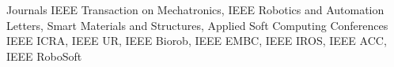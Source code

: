 

\begin{cvskills}
  \cvskill
    {Journals} %
    {IEEE Transaction on Mechatronics, IEEE Robotics and Automation Letters,
    	Smart Materials and Structures,  Applied Soft Computing} %
  \cvskill
    {Conferences} %
    {IEEE ICRA, IEEE UR, IEEE Biorob, IEEE EMBC, IEEE IROS, IEEE ACC, IEEE RoboSoft} %
 \cvskill
{} %
{} %
\end{cvskills}
